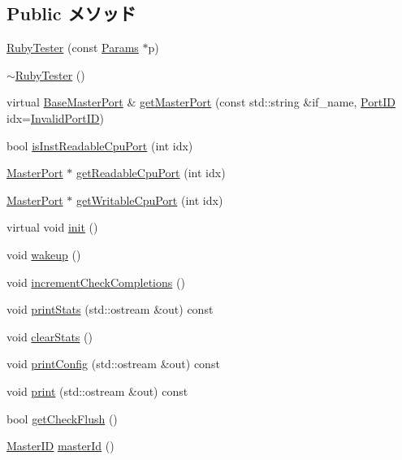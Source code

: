 \subsection*{Public メソッド}
\begin{DoxyCompactItemize}
\item 
\hyperlink{classRubyTester_ae8f6793530023408995b1e046935c263}{RubyTester} (const \hyperlink{classRubyTester_a6785f65e1745860fc5b53cbf4aefc2f7}{Params} $\ast$p)
\item 
\hyperlink{classRubyTester_ac53d3f47921859fb0e3792c18c8643d7}{$\sim$RubyTester} ()
\item 
virtual \hyperlink{classBaseMasterPort}{BaseMasterPort} \& \hyperlink{classRubyTester_adc4e675e51defbdd1e354dac729d0703}{getMasterPort} (const std::string \&if\_\-name, \hyperlink{base_2types_8hh_acef4d7d41cb21fdc252e20c04cd7bb8e}{PortID} idx=\hyperlink{base_2types_8hh_a65bf40f138cf863f0c5e2d8ca1144126}{InvalidPortID})
\item 
bool \hyperlink{classRubyTester_a42293ff3a28b9881992792d7fdee907b}{isInstReadableCpuPort} (int idx)
\item 
\hyperlink{classMasterPort}{MasterPort} $\ast$ \hyperlink{classRubyTester_aa82782a52c45fe9caea72eb6beee63c3}{getReadableCpuPort} (int idx)
\item 
\hyperlink{classMasterPort}{MasterPort} $\ast$ \hyperlink{classRubyTester_a77680df4a8d2917c7f961e56eff08e96}{getWritableCpuPort} (int idx)
\item 
virtual void \hyperlink{classRubyTester_a02fd73d861ef2e4aabb38c0c9ff82947}{init} ()
\item 
void \hyperlink{classRubyTester_ae674290a26ecbd622c5160e38e8a4fe9}{wakeup} ()
\item 
void \hyperlink{classRubyTester_a7bf3ac9b8e83cf7ec4fd1462ead30b3b}{incrementCheckCompletions} ()
\item 
void \hyperlink{classRubyTester_a38f932a0a623730fe10783f46d243cef}{printStats} (std::ostream \&out) const 
\item 
void \hyperlink{classRubyTester_ac7ec7476159db4e2bb0372e30010fc9e}{clearStats} ()
\item 
void \hyperlink{classRubyTester_a773d0e977425600264039f8941f18496}{printConfig} (std::ostream \&out) const 
\item 
void \hyperlink{classRubyTester_ac55fe386a101fbae38c716067c9966a0}{print} (std::ostream \&out) const 
\item 
bool \hyperlink{classRubyTester_ae69c65056b8f5eb9fee22f365c58662c}{getCheckFlush} ()
\item 
\hyperlink{request_8hh_ac366b729262fd8e7cbd3283da6f775cf}{MasterID} \hyperlink{classRubyTester_a9b7d32db0521388c0953e531c79aab50}{masterId} ()
\end{DoxyCompactItemize}
